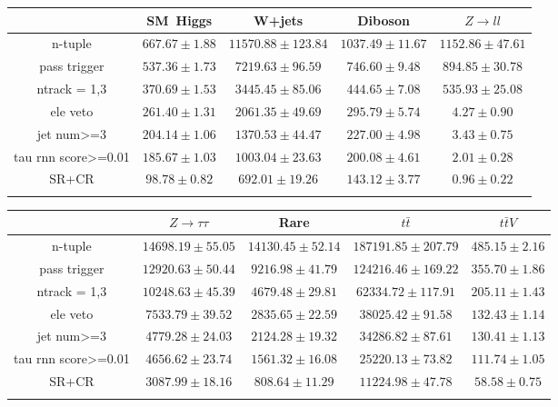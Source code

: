 \centering
\begin{tabular}{ccccc} \toprule\toprule
 & SM~Higgs & W+jets & Diboson & $Z\to ll$\\\midrule
n-tuple & $667.67\pm1.88$ & $11570.88\pm123.84$ & $1037.49\pm11.67$ & $1152.86\pm47.61$\\
pass trigger & $537.36\pm1.73$ & $7219.63\pm96.59$ & $746.60\pm9.48$ & $894.85\pm30.78$\\
ntrack = 1,3 & $370.69\pm1.53$ & $3445.45\pm85.06$ & $444.65\pm7.08$ & $535.93\pm25.08$\\
ele veto & $261.40\pm1.31$ & $2061.35\pm49.69$ & $295.79\pm5.74$ & $4.27\pm0.90$\\
jet num>=3 & $204.14\pm1.06$ & $1370.53\pm44.47$ & $227.00\pm4.98$ & $3.43\pm0.75$\\
tau rnn score>=0.01 & $185.67\pm1.03$ & $1003.04\pm23.63$ & $200.08\pm4.61$ & $2.01\pm0.28$\\
SR+CR & $98.78\pm0.82$ & $692.01\pm19.26$ & $143.12\pm3.77$ & $0.96\pm0.22$\\
\bottomrule\bottomrule\\
\end{tabular}
\begin{tabular}{ccccc} \toprule\toprule
 & $Z\to \tau\tau$ & Rare & $t\bar{t}$ & $t\bar{t}V$\\\midrule
n-tuple & $14698.19\pm55.05$ & $14130.45\pm52.14$ & $187191.85\pm207.79$ & $485.15\pm2.16$\\
pass trigger & $12920.63\pm50.44$ & $9216.98\pm41.79$ & $124216.46\pm169.22$ & $355.70\pm1.86$\\
ntrack = 1,3 & $10248.63\pm45.39$ & $4679.48\pm29.81$ & $62334.72\pm117.91$ & $205.11\pm1.43$\\
ele veto & $7533.79\pm39.52$ & $2835.65\pm22.59$ & $38025.42\pm91.58$ & $132.43\pm1.14$\\
jet num>=3 & $4779.28\pm24.03$ & $2124.28\pm19.32$ & $34286.82\pm87.61$ & $130.41\pm1.13$\\
tau rnn score>=0.01 & $4656.62\pm23.74$ & $1561.32\pm16.08$ & $25220.13\pm73.82$ & $111.74\pm1.05$\\
SR+CR & $3087.99\pm18.16$ & $808.64\pm11.29$ & $11224.98\pm47.78$ & $58.58\pm0.75$\\
\bottomrule\bottomrule\\
\end{tabular}
